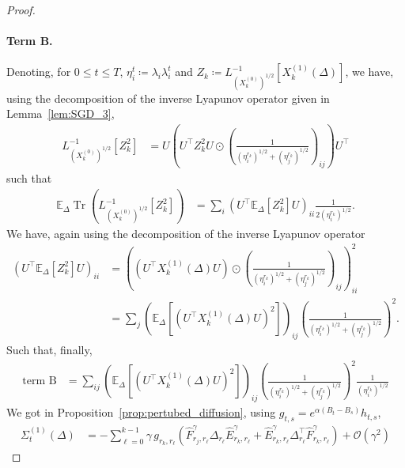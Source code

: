\documentclass[11pt]{article}
\newcommand{\tr}[1]{\operatorname{Tr}\left({#1}\right)}
\newcommand{\eqdef}{\coloneqq}
\newcommand{\EE}{\mathbb{E}}
\begin{document}
\begin{proof}
\paragraph{Term B.} Denoting, for $0 \leq t \leq T$, $\eta_i^t \eqdef \lambda_i \lambda^t_i$ and $ Z_k \eqdef L_{\left(X_k^{(0)}\right)^{1/2}}^{-1}[X_k^{(1)}(\Delta)] $, 
we have, using the decomposition of the inverse Lyapunov operator given in Lemma~\ref{lem:SGD_3},
\begin{align*}
L_{(X^{(0)}_k)^{1/2}}^{-1}\left[Z_k^2\right] &=  U \left( U^\top Z_k^2 U \odot \left(\frac{1}{ (\eta^{r_k}_i)^{1/2} + (\eta^{r_k}_j)^{1/2} }\right)_{ij} \right) U^\top 
\end{align*}
such that
\begin{align*}
\EE_{\Delta} \tr{L_{(X^{(0)}_k)^{1/2}}^{-1}\left[Z_k^2\right]} &= \sum_i  \left( U^\top \EE_{\Delta} \left[  Z_k^2\right] U \right)_{ii} \frac{1}{2 (\eta^{r_k}_i)^{1/2}} .
\end{align*}
We have, again using the decomposition of the inverse Lyapunov operator
\begin{align*}
    \left(U^\top \EE_{\Delta}\left[Z_k^2\right] U \right)_{ii} &=   
    \left( (U^\top X^{(1)}_{k} (\Delta) U) \odot \left(\frac{1}{ (\eta^{r_k}_i)^{1/2} + (\eta^{r_k}_j)^{1/2} }\right)_{ij} \right)^2_{ii} \\
    &=
    \sum_{j} \left(\EE_{\Delta}\left[(U^\top X^{(1)}_k(\Delta) U)^2 \right]\right)_{ij} \left(\frac{1}{ (\eta^{r_k}_i)^{1/2} + (\eta^{r_k}_j)^{1/2} }\right)^2 .
\end{align*}
Such that, finally,
\begin{align} \label{eq:termB_1}
\text{term B} &=  \sum_{ij} \left(\EE_{\Delta}\left[(U^\top X^{(1)}_k(\Delta) U)^2 \right]\right)_{ij} \left(\frac{1}{ (\eta^{r_k}_i)^{1/2} + (\eta^{r_k}_j)^{1/2} }\right)^2 \frac{1}{(\eta^{r_k}_i)^{1/2}}
\end{align}
We got in Proposition~\ref{prop:pertubed_diffusion}, using $g_{t,s} = e^{\alpha(B_{t} - B_{s})} h_{t,s}$, 
\begin{align*}
 \Sigma_{t}^{(1)}(\Delta) 
 &= - \sum_{\ell=0}^{k-1} \gamma \, g_{r_k,r_\ell} \left( \hat F^\gamma_{r_j,r_\ell} \Delta_{r_\ell} \hat E^\gamma_{r_k,r_\ell} +   \hat E^\gamma_{r_k,r_\ell} \Delta_{r_\ell}^\top \hat F^\gamma_{r_k,r_\ell} \right) + \mathcal{O}(\gamma^2)

\end{align*}
\end{proof}
\end{document}
